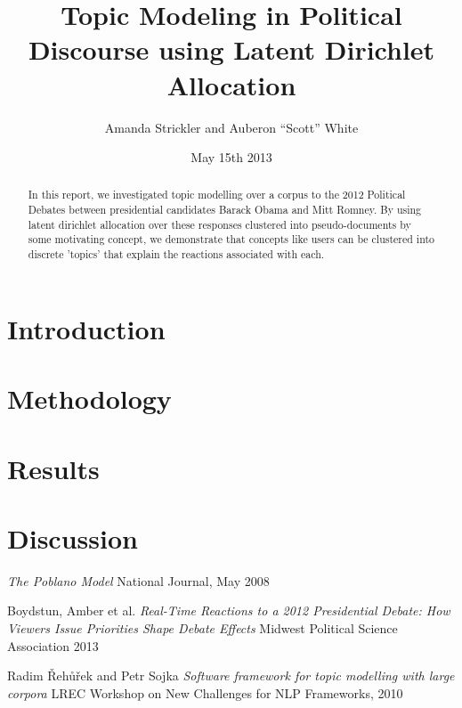 \documentclass[12pt]{report}
\begin{document}
\title{Topic Modeling in Political Discourse using Latent Dirichlet Allocation}
\author{Amanda Strickler and Auberon ``Scott'' White}
\date{May 15th 2013}
\maketitle

\begin{abstract}
In this report, we investigated topic modelling over a corpus to the 2012 Political Debates between presidential candidates Barack Obama and Mitt Romney. By using latent dirichlet allocation over these responses clustered into pseudo-documents by some motivating concept, we demonstrate that concepts like users can be clustered into discrete 'topics' that explain the reactions associated with each.
\end{abstract}

\section{Introduction}
\label{sec:1}


\section{Methodology}
\label{sec:2}


\section{Results}
\label{sec:3}


\section{Discussion}
\label{sec:4}






\begin{thebibliography}{99}
  \emph{The Poblano Model}
  National Journal, May 2008

  Boydstun, Amber et al.
  \emph{Real-Time Reactions to a 2012 Presidential Debate: How Viewers Issue Priorities Shape Debate Effects}
  Midwest Political Science Association 2013

  Radim Řehůřek and Petr Sojka 
  \emph{Software framework for topic modelling with large corpora}
  LREC Workshop on New Challenges for NLP Frameworks, 2010
\end{thebibliography}
\end{document}
